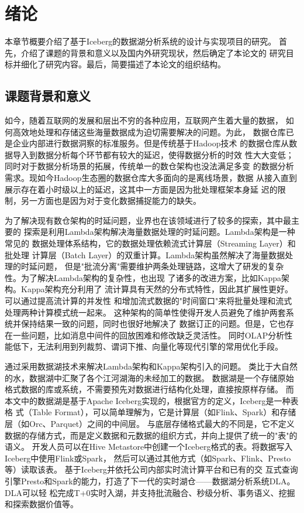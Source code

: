
\chapter{绪论}

本章节概要介绍了基于Iceberg的数据湖分析系统的设计与实现项目的研究。
首先，介绍了课题的背景和意义以及国内外研究现状，然后确定了本论文的
研究目标并细化了研究内容。最后，简要描述了本论文的组织结构。

\section{课题背景和意义}

如今，随着互联网的发展和层出不穷的各种应用，互联网产生着大量的数据，
如何高效地处理和存储这些海量数据成为迫切需要解决的问题\cite{1}。为此，
数据仓库已是企业内部进行数据洞察的标准服务。但是传统基于Hadoop技术\cite{2}
的数据仓库从数据导入到数据分析每个环节都有较大的延迟，使得数据分析的时效
性大大变低；同时对于数据分析场景的拓展，传统单一的数仓架构也没法满足多变
的数据分析需求。现如今Hadoop生态圈的数据仓库大多面向的是离线场景，数据
从接入直到展示存在着小时级以上的延迟，这其中一方面是因为批处理框架本身延
迟的限制，另一方面也是因为对于变化数据捕捉能力的缺失。

为了解决现有数仓架构的时延问题，业界也在该领域进行了较多的探索，其中最主要的
探索是利用Lambda架构\cite{3}解决海量数据处理的时延问题。Lambda架构是一种常见的
数据处理体系结构，它的数据处理依赖流式计算层（Streaming Layer）和批处理
计算层（Batch Layer）的双重计算。Lambda架构虽然解决了海量数据处理的时延问题，
但是"批流分离"需要维护两条处理链路，这增大了研发的复杂性。为了解决Lambda架构的复杂性，也出现
了诸多的改进方案，比如Kappa架构\cite{4}。Kappa架构充分利用了
流计算具有天然的分布式特性，因此其扩展性更好。可以通过提高流计算的并发性
和增加流式数据的"时间窗口"来将批量处理和流式处理两种计算模式统一起来。
这种架构的简单性使得开发人员避免了维护两套系统并保持结果一致的问题，同时也很好地解决了
数据订正的问题。但是，它也存在一些问题，比如消息中间件的回放困难和修改缺乏灵活性。
同时OLAP分析性能低下，无法利用到列裁剪、谓词下推、向量化等现代引擎的常用优化手段。

通过采用数据湖技术来解决Lambda架构和Kappa架构引入的问题。
类比于大自然的水，数据湖中汇聚了各个江河湖海的未经加工的数据。
数据湖是一个存储原始格式数据的库或系统，不需要预先对数据进行结构化处理，直接按原样存储\cite{5,6,7,8}。
而本文中的数据湖是基于Apache Iceberg实现的，根据官方的定义，Iceberg是一种表格
式（Table Format），可以简单理解为，它是计算层（如Flink、Spark）和存储层（如Orc\cite{9}、Parquet\cite{10}）之间的中间层。
与底层存储格式最大的不同是，它不定义数据的存储方式，而是定义数据和元数据的组织方式，并向上提供了统一的"表"的语义。
开发人员可以在Hive Metastore中创建一个Iceberg格式的表。将数据写入Iceberg中使用Flink或Spark，
然后可以通过其他方式（如Spark、Flink、Presto\cite{11}等）读取该表。
基于Iceberg并依托公司内部实时流计算平台和已有的交
互式查询引擎Presto和Spark的能力，打造了下一代的实时湖仓——数据湖分析系统DLA。DLA可以轻
松完成T+0实时入湖，并支持批流融合、秒级分析、事务语义、挖掘和探索数据价值等。

